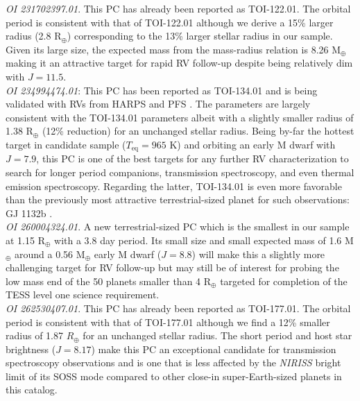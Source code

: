 \emph{OI 231702397.01}. This PC has already been reported as TOI-122.01. The \pipeline{} orbital
period is consistent with that of TOI-122.01 although we derive a 15\% larger radius (2.8 R$_{\oplus}$)
corresponding to the 13\% larger stellar radius in our sample. Given its large size, the expected
mass from the \cite{chen17} mass-radius relation is 8.26 M$_{\oplus}$ making it an attractive target
for rapid RV follow-up despite being relatively dim with $J=11.5$. \\

\emph{OI 234994474.01}: This PC has been reported as TOI-134.01 and is being validated with RVs
from HARPS and PFS \citep{astudillodefru19}. The \pipeline{} parameters are largely consistent with the TOI-134.01
parameters albeit with a slightly smaller radius of 1.38 R$_{\oplus}$ (12\% reduction) for
an unchanged stellar radius. Being by-far the hottest target in candidate sample ($T_{\text{eq}}=965$ K)
and orbiting an early M dwarf with $J=7.9$, this PC is one of the best targets for any further RV
characterization to search for longer period companions, transmission spectroscopy, and even thermal
emission spectroscopy. Regarding the latter, TOI-134.01
is even more favorable than the previously most attractive
terrestrial-sized planet for such observations: GJ 1132b \citep{morley17}. \\

\emph{OI 260004324.01}. A new terrestrial-sized PC which is the smallest in our sample
at 1.15 R$_{\oplus}$ with a 3.8 day period. Its small size and small expected mass of 1.6 M$_{\oplus}$
around a 0.56 M$_{\oplus}$ early M dwarf ($J=8.8$) will make this a slightly more challenging target
for RV follow-up but may still be of interest for probing the low mass end of the 50 planets
smaller than 4 R$_{\oplus}$ targeted for completion of the TESS level one science requirement. \\

\emph{OI 262530407.01}. This PC has already been reported as TOI-177.01. The \pipeline{} orbital
period is consistent with that of TOI-177.01 although we find a 12\% smaller radius of 1.87
$R_{\oplus}$ for an unchanged stellar radius. The short period and host star brightness ($J=8.17$)
make this PC an exceptional candidate for transmission spectroscopy observations and is one
that is less affected by the \emph{NIRISS} bright limit of its SOSS mode compared to other
close-in super-Earth-sized planets in this catalog. \\

